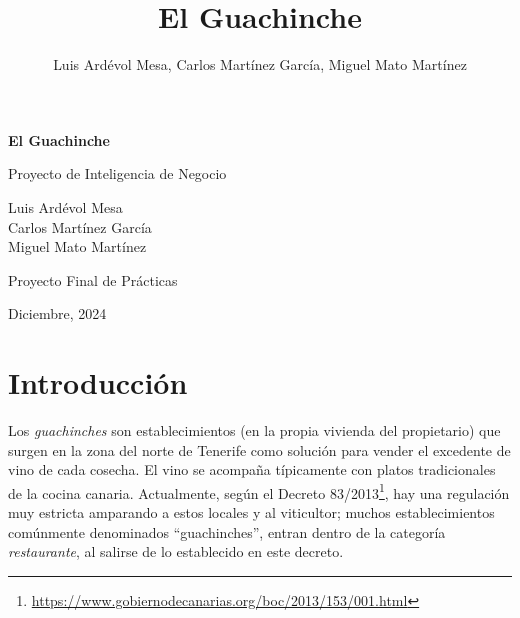 \documentclass[11pt]{opticajnl}
\title{El Guachinche}
\author[1,2,3]{Luis Ardévol Mesa, Carlos Martínez García, Miguel Mato Martínez}
\begin{document}
\begin{titlepage}
\begin{center}
    \vspace*{5cm}
    
    {\huge\bfseries El Guachinche\par}
    \vspace{1cm}
    
    {\Large\color{crimson} Proyecto de Inteligencia de Negocio\par}
    \vspace{1cm}
    
    
    \vspace{1.5cm}
    {\large Luis Ardévol Mesa\\
    Carlos Martínez García\\
    Miguel Mato Martínez\par}
    
    \vfill
    
    {\large Proyecto Final de Prácticas\par}
    
    \vspace{2cm}
    
    {\large Diciembre, 2024\par}
\end{center}
\end{titlepage}

\maketitle

\setcounter{tocdepth}{2}
\tableofcontents

\hrulefill

\section{Introducción}

Los \textit{guachinches} son establecimientos (en la propia vivienda del propietario) que surgen en la zona del norte de Tenerife como solución para vender el excedente de vino de cada cosecha. El vino se acompaña típicamente con platos tradicionales de la cocina canaria. Actualmente, según el Decreto 83/2013\footnote{\url{https://www.gobiernodecanarias.org/boc/2013/153/001.html}}, hay una regulación muy estricta amparando a estos locales y al viticultor; muchos establecimientos comúnmente denominados ``guachinches'', entran dentro de la categoría \textit{restaurante}, al salirse de lo establecido en este decreto. \\
\end{document}

